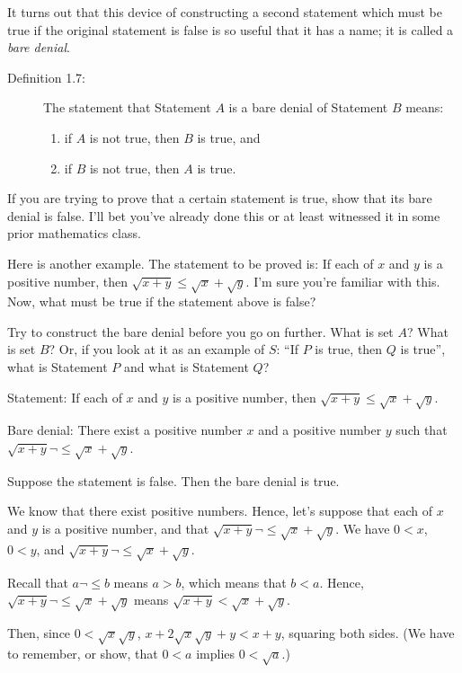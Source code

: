 \documentclass[english]{book}
\begin{document}
It turns out that this device of constructing a second statement which must be true if the original statement is false is so useful that it has a name; it is called a \emph{bare denial}.

\begin{description}
\item[Definition 1.7:] The statement that Statement $A$ is a bare denial of Statement $B$ means:
  \begin{enumerate}[\hspace{1cm}1)]
    \item if $A$ is not true, then $B$ is true, and
    \item if $B$ is not true, then $A$ is true.
  \end{enumerate}
\end{description}

If you are trying to prove that a certain statement is true, show that its bare denial is false. I'll bet you've already done this or at least witnessed it in some prior mathematics class. 

Here is another example. The statement to be proved is: If each of $x$ and $y$ is a positive number, then $\sqrt{x+y} \leq \sqrt{x} + \sqrt{y}$. I'm sure you're familiar with this. Now, what must be true if the statement above is false? 

Try to construct the bare denial before you go on further. What is set $A$? What is set $B$? Or, if you look at it as an example of $S$: ``If $P$ is true, then $Q$ is true'', what is Statement $P$ and what is Statement $Q$?

Statement: If each of $x$ and $y$ is a positive number, then $\sqrt{x+y} \leq \sqrt{x} + \sqrt{y}$.

Bare denial: There exist a positive number $x$ and a positive number $y$ such that $\sqrt{x+y} \neg \leq \sqrt{x} + \sqrt{y}$. 

Suppose the statement is false. Then the bare denial is true.

We know that there exist positive numbers. Hence, let's suppose that each of $x$ and $y$ is a positive number, and that $\sqrt{x+y} \neg \leq \sqrt{x} + \sqrt{y}$. We have $0<x$, $0<y$, and $\sqrt{x+y} \neg \leq \sqrt{x} + \sqrt{y}$. 

Recall that $a \neg \leq b$ means $a>b$, which means that $b<a$. Hence, $\sqrt{x+y} \neg \leq \sqrt{x} + \sqrt{y}$ means $\sqrt{x+y} < \sqrt{x} + \sqrt{y}$. 

Then, since $0< \sqrt{x} \sqrt{y}$, $x+2 \sqrt{x} \sqrt{y} + y < x+y$, squaring both sides. (We have to remember, or show, that $0<a$ implies $0 < \sqrt{a}$.) 
\end{document}
